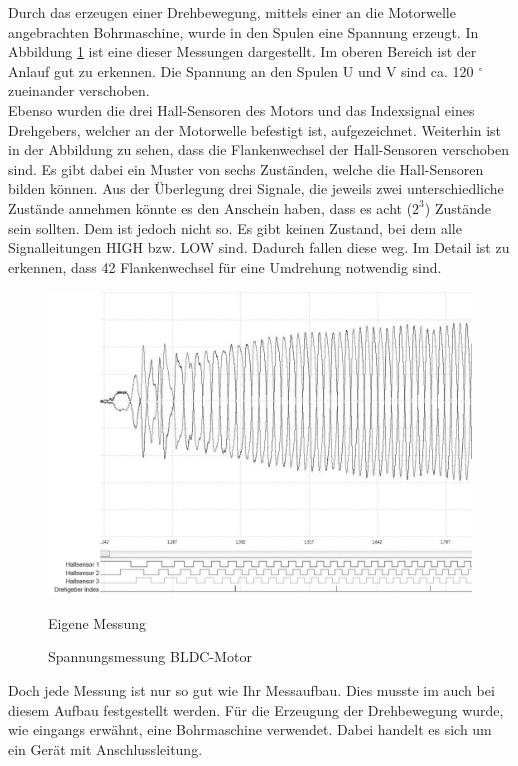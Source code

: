 \newpage
Durch das erzeugen einer Drehbewegung, mittels einer an die Motorwelle angebrachten Bohrmaschine, wurde in den Spulen eine Spannung erzeugt.
In Abbildung \ref{fig:Spannungsmessung_BLDC_Motor} ist eine dieser Messungen dargestellt.
Im oberen Bereich ist der Anlauf gut zu erkennen.
Die Spannung an den Spulen U und V sind ca. 120 $^\circ$ zueinander verschoben.\\


Ebenso wurden die drei Hall-Sensoren des Motors und das Indexsignal eines Drehgebers, welcher an der Motorwelle befestigt ist, aufgezeichnet.
Weiterhin ist in der Abbildung zu sehen, dass die Flankenwechsel der Hall-Sensoren verschoben sind.
Es gibt dabei ein Muster von sechs Zuständen, welche die Hall-Sensoren bilden können.
Aus der Überlegung drei Signale, die jeweils zwei unterschiedliche Zustände annehmen könnte es den Anschein haben, dass es acht ($2^3$) Zustände sein sollten.
Dem ist jedoch nicht so. 
Es gibt keinen Zustand, bei dem alle Signalleitungen HIGH bzw. LOW sind. Dadurch fallen diese weg.
Im Detail ist zu erkennen, dass 42 Flankenwechsel für eine Umdrehung notwendig sind.

\begin{figure}[htbp]
	\centering
	\includegraphics[width=\textwidth-4cm]{tests/graphics/Spannungssignal_Messung}
	\caption{Spannungsmessung BLDC-Motor}
	\label{fig:Spannungsmessung_BLDC_Motor}
	\quelle Eigene Messung
\end{figure}


Doch jede Messung ist nur so gut wie Ihr Messaufbau.
Dies musste im auch bei diesem Aufbau festgestellt werden.
Für die Erzeugung der Drehbewegung wurde, wie eingangs erwähnt, eine Bohrmaschine verwendet.
Dabei handelt es sich um ein Gerät mit Anschlussleitung.\\


